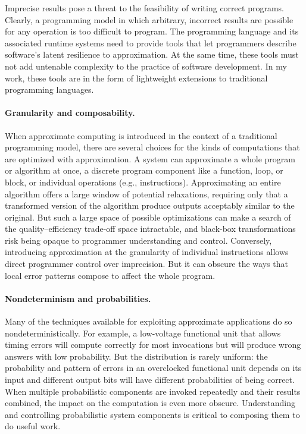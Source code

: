 Imprecise results pose a threat to the feasibility of writing correct
programs. Clearly, a programming model in which arbitrary, incorrect results
are possible for any operation is too difficult to program. The programming
language and its associated runtime systems need to provide tools that let
programmers describe software's latent resilience to approximation. At the
same time, these tools must not add
untenable
complexity to the practice of software development. In my work, these
tools are in the form of lightweight extensions to traditional programming
languages.

\paragraph{Granularity and composability.}

When approximate computing is introduced in the context of a traditional
programming model, there are several choices for the kinds of computations
that are optimized with approximation. A system can approximate a whole
program or algorithm at once, a discrete program component like a function,
loop, or block, or individual operations (e.g., instructions).
Approximating an entire algorithm 
offers a large window of potential relaxations,
requiring only that a transformed version of the algorithm produce outputs
acceptably similar to the original.
But such a large space of possible optimizations can make a search of the
quality--efficiency trade-off space intractable, and black-box transformations
risk being opaque to programmer understanding and control.
Conversely, introducing approximation at the granularity of individual
instructions allows direct programmer control over imprecision. But it can
obscure the ways that local error patterns compose to affect the whole
program.

\paragraph{Nondeterminism and probabilities.}

Many of the techniques available for exploiting approximate applications do so
nondeterministically. For example, a low-voltage functional unit that allows
timing errors will compute correctly for most invocations but will produce wrong
answers with low probability. But the distribution is rarely uniform: the
probability and pattern of errors in an overclocked functional unit depends on
its input and different output bits will have different probabilities of being
correct. When multiple probabilistic components are invoked repeatedly and
their results combined, the impact on the computation is even more obscure.
Understanding and controlling probabilistic system components is critical to
composing them to do useful work.

